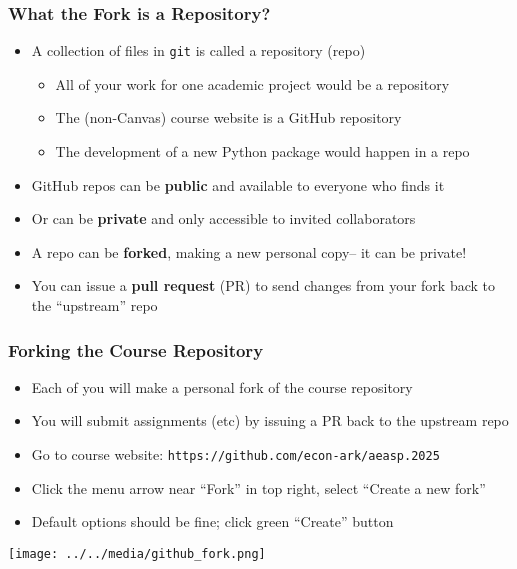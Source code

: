 \documentclass[aspectratio=169]{beamer}
\begin{document}

\begin{frame}
\frametitle{What the Fork is a Repository?}
\begin{itemize}
	\item A collection of files in \texttt{git} is called a repository (repo)
	\begin{itemize}
		\item All of your work for one academic project would be a repository
	
		\item The (non-Canvas) course website is a GitHub repository
	
		\item The development of a new Python package would happen in a repo
	\end{itemize}
	
	\item <2->GitHub repos can be \textbf{public} and available to everyone who finds it
	
	\item <2->Or can be \textbf{private} and only accessible to invited collaborators
	
	\item <3->A repo can be \textbf{forked}, making a new personal copy-- it can be private!
	
	\item <3->You can issue a \textbf{pull request} (PR) to send changes from your fork back to the ``upstream'' repo
\end{itemize}
\end{frame}

\begin{frame}
\frametitle{Forking the Course Repository}
\begin{itemize}
	\item Each of you will make a personal fork of the course repository
	
	\item You will submit assignments (etc) by issuing a PR back to the upstream repo
	
	\item Go to course website: \texttt{https://github.com/econ-ark/aeasp.2025}
	
	\item Click the menu arrow near ``Fork'' in top right, select ``Create a new fork''
	
	\item Default options should be fine; click green ``Create'' button	
\end{itemize}

{\centering
\texttt{[image: ../../media/github\_fork.png]}}
\end{frame}
\end{document}
